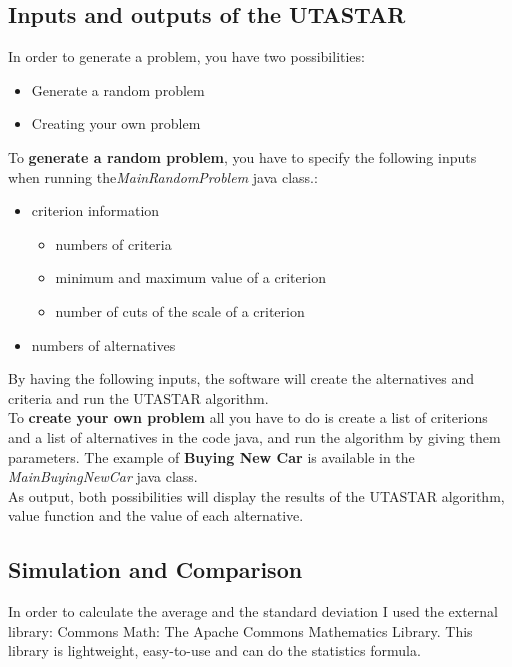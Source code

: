 \documentclass{report}
\begin{document}
\subsection{Inputs and outputs of the UTASTAR}
In order to generate a problem, you have two possibilities:
\begin{itemize}
\item Generate a random problem
\item Creating your own problem
\end{itemize}
To \textbf{generate a random problem}, you have to specify the following inputs when running the\textit{MainRandomProblem} java class.:
\begin{itemize}
\item criterion information
\begin{itemize}
\item numbers of criteria
\item minimum and maximum value of a criterion
\item number of cuts of the scale of a criterion
\end{itemize}
\item numbers of alternatives
\end{itemize}
By having the following inputs, the software will create the alternatives and criteria and run the UTASTAR algorithm.\\
To \textbf{create your own problem} all you have to do is create a list of criterions and a list of alternatives in the code java, and run the algorithm by giving them parameters. The example of \textbf{Buying New Car} is available in the \textit{MainBuyingNewCar} java class. \\

As output, both possibilities will display the results of the UTASTAR algorithm, value function and the value of each alternative.\\

\subsection{Simulation and Comparison}
In order to calculate the average and the standard deviation I used the external library: Commons Math: The Apache Commons Mathematics Library. This library is lightweight, easy-to-use and can do the statistics formula.
\end{document}

